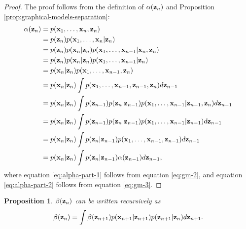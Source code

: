 \documentclass[12pt, oneside]{book}
\numberwithin{equation}{section}
\newcommand{\x}{{\bf x}}
\newcommand{\z}{{\bf z}}
\newtheorem{proposition}{Proposition}[section]
\begin{document}
{\begin{proof}
	The proof follows from the definition of $\alpha(\z_n)$ and Proposition \ref{prop:graphical-models-separation}:
	\begin{align}
		\alpha(\z_n) &= p(\x_1, \ldots, \x_n, \z_n) \\
		&= p(\z_n) p(\x_1, \ldots, \x_n \vert \z_n) \\
		&= p(\z_n) p(\x_n \vert \z_n) p(\x_1, \ldots, \x_{n-1} \vert \x_n, \z_n) \\
		&= p(\z_n) p(\x_n \vert \z_n) p(\x_1, \ldots, \x_{n-1} \vert \z_n) \label{eq:alpha-part-1}\\
		&= p(\x_n \vert \z_n) p(\x_1, \ldots, \x_{n-1}, \z_n) \\
		&= p(\x_n \vert \z_n) \int p(\x_1, \ldots, \x_{n-1}, \z_{n-1}, \z_n) d\z_{n-1}\\
		&= p(\x_n \vert \z_n) \int p(\z_{n-1})p(\z_n \vert \z_{n-1})p(\x_1, \ldots, \x_{n-1} \vert \z_{n-1}, \z_n) d\z_{n-1}\\
		&= p(\x_n \vert \z_n) \int p(\z_{n-1})p(\z_n \vert \z_{n-1})p(\x_1, \ldots, \x_{n-1} \vert \z_{n-1}) d\z_{n-1} \label{eq:alpha-part-2}\\ 
		&= p(\x_n \vert \z_n) \int p(\z_n \vert \z_{n-1})p(\x_1, \ldots, \x_{n-1}, \z_{n-1}) d\z_{n-1}\\
		&= p(\x_n \vert \z_n) \int p(\z_n \vert \z_{n-1})\alpha(\z_{n-1}) d\z_{n-1},
	\end{align}
	where equation \eqref{eq:alpha-part-1} follows from equation \eqref{eq:gm-2}, and equation \eqref{eq:alpha-part-2} follows from equation \eqref{eq:gm-3}.
\end{proof}

\begin{proposition} \label{prop:beta-recursive}
	$\beta(\z_n)$ can be written recursively as
	\begin{equation}
		\beta(\z_n) = \int  \beta(\z_{n+1})p(\x_{n+1}\vert \z_{n+1}) p(\z_{n+1}\vert \z_n) d\z_{n+1}.
	\end{equation} 
\end{proposition}

}
\end{document}
